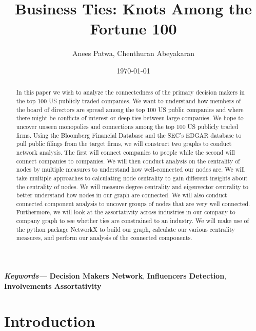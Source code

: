 \documentclass[a4paper]{article}
\providecommand{\keywords}[1]
{
  \small	
  \textbf{\; \textit{Keywords---}} #1
}
\begin{document}
\title{\textbf{\huge{Business Ties: Knots Among the Fortune 100}}}

\author{\textbf\large{Anees Patwa, Chenthuran Abeyakaran}}


\date{\today}

\maketitle
\begin{abstract}
    In this paper we wish to analyze the connectedness of the primary decision makers in the top 100 US publicly traded companies. We want to understand how members of the board of directors are spread among the top 100 US public companies and where there might be conflicts of interest or deep ties between large companies. We hope to uncover unseen monopolies and connections among the top 100 US publicly 
    traded firms. Using the Bloomberg Financial Database and the SEC's EDGAR database to pull public filings from the target firms, we will construct two graphs to conduct network analysis. The first will connect companies to people while the second will connect companies to companies. We will then conduct analysis on the centrality of nodes by multiple measures to understand how well-connected our nodes are. We will take multiple approaches to calculating node centrality to gain different insights about the centrality of nodes. We will measure degree centrality and eigenvector centrality to better understand how nodes in our graph are connected. We will also conduct connected component analysis to uncover groups of nodes that are very well connected. Furthermore, we will look at the assortativity across industries in our company to company graph to see whether ties are constrained to an industry. We will make use of the python package NetworkX to build our graph, calculate our various centrality measures, and perform our analysis of the connected components.
\end{abstract}\maketitle

\keywords{\textbf{Decision Makers Network}, \textbf{Influencers Detection}, \textbf{Involvements Assortativity}}

\section*{Introduction}
\end{document}
